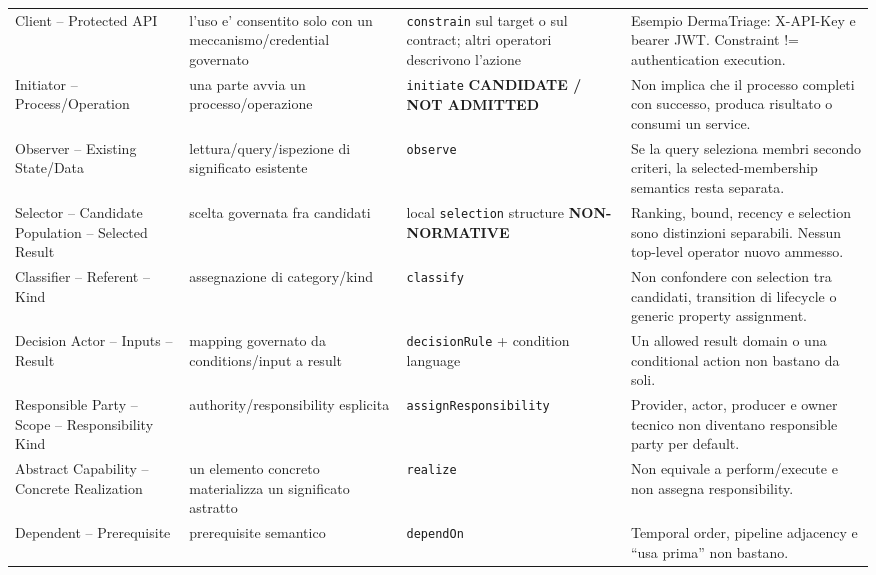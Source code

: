 \documentclass[11pt,a4paper]{article}
\begin{document}
\begin{landscape}
\begin{longtable}{L{38mm}L{44mm}L{55mm}L{92mm}}
Client -- Protected API & l'uso e' consentito solo con un meccanismo/credential governato & \texttt{constrain} sul target o sul contract; altri operatori descrivono l'azione & Esempio DermaTriage: X-API-Key e bearer JWT. Constraint != authentication execution. \\

Initiator -- Process/Operation & una parte avvia un processo/operazione & \texttt{initiate} \textbf{CANDIDATE / NOT ADMITTED} & Non implica che il processo completi con successo, produca risultato o consumi un service. \\

Observer -- Existing State/Data & lettura/query/ispezione di significato esistente & \texttt{observe} & Se la query seleziona membri secondo criteri, la selected-membership semantics resta separata. \\

Selector -- Candidate Population -- Selected Result & scelta governata fra candidati & local \texttt{selection} structure \textbf{NON-NORMATIVE} & Ranking, bound, recency e selection sono distinzioni separabili. Nessun top-level operator nuovo ammesso. \\

Classifier -- Referent -- Kind & assegnazione di category/kind & \texttt{classify} & Non confondere con selection tra candidati, transition di lifecycle o generic property assignment. \\

Decision Actor -- Inputs -- Result & mapping governato da conditions/input a result & \texttt{decisionRule} + condition language & Un allowed result domain o una conditional action non bastano da soli. \\

Responsible Party -- Scope -- Responsibility Kind & authority/responsibility esplicita & \texttt{assignResponsibility} & Provider, actor, producer e owner tecnico non diventano responsible party per default. \\

Abstract Capability -- Concrete Realization & un elemento concreto materializza un significato astratto & \texttt{realize} & Non equivale a perform/execute e non assegna responsibility. \\

Dependent -- Prerequisite & prerequisite semantico & \texttt{dependOn} & Temporal order, pipeline adjacency e ``usa prima'' non bastano. \\


\end{longtable}
\end{landscape}
\end{document}
